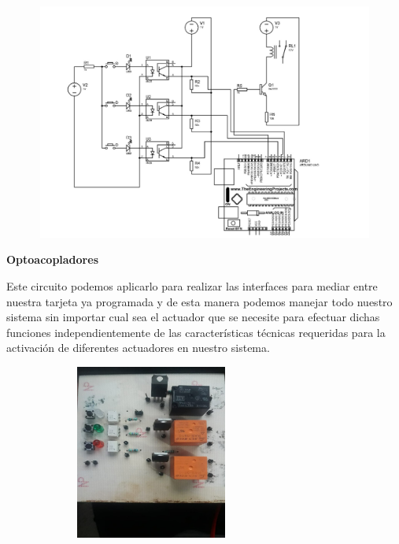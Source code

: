 \documentclass[12pt]{article}
\begin{document}
\vspace{\baselineskip}



\begin{figure}[H]
\advance\leftskip 0.27in		\includegraphics[width=6.91in,height=3.06in]{./media/image10.png}
\end{figure}



\par
\textbf{Optoacopladores}

Este circuito podemos aplicarlo para realizar las interfaces para mediar entre nuestra tarjeta ya programada y de esta manera podemos manejar todo nuestro sistema sin importar cual sea el actuador que se necesite para efectuar dichas funciones independientemente de las características técnicas requeridas para la activación de diferentes actuadores en nuestro sistema.\par



\begin{figure}[H]
	\begin{Center}
		\includegraphics[width=3.0in,height=2.26in]{./media/image18.jpeg}
	\end{Center}
\end{figure}
\end{document}
